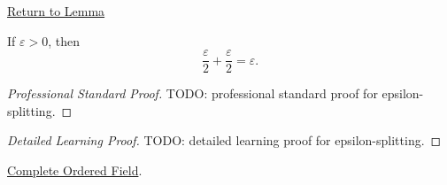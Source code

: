 \newpage
{}
\label{prf:epsilon-splitting}

\begin{remark*}[Return]
\hyperref[lem:epsilon-splitting]{Return to Lemma}
\end{remark*}

\begin{lemma*}
If $\varepsilon>0$, then
\[
\frac{\varepsilon}{2}+\frac{\varepsilon}{2}=\varepsilon.
\]
\end{lemma*}

\begin{proof}[Professional Standard Proof]
\LRAProofBodyStart
TODO: professional standard proof for epsilon-splitting.
\end{proof}

\begin{proof}[Detailed Learning Proof]
\LRAProofBodyStart
TODO: detailed learning proof for epsilon-splitting.
\end{proof}

\begin{remark*}
\end{remark*}

\begin{dependencies}
\hyperref[def:real-ordered-field]{Complete Ordered Field}.
\end{dependencies}

\clearpage
